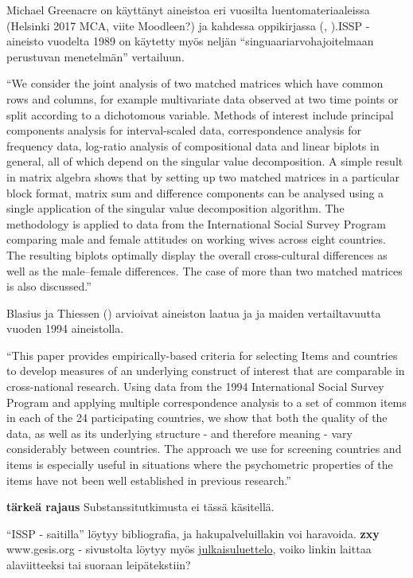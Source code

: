 \documentclass[
  finnish,
]{book}
\begin{document}
Michael Greenacre on käyttänyt aineistoa eri vuosilta luentomateriaaleissa (Helsinki 2017 MCA, viite Moodleen?) ja kahdessa oppikirjassa (\citep{RefWorks:doc:5a857a43e4b0ed2d44664d7c}, \citep{RefWorks:doc:5a857a43e4b0ed2d44664d78}).ISSP - aineisto vuodelta 1989 on käytetty myös neljän ``singuaariarvohajoitelmaan perustuvan menetelmän'' vertailuun\citep{RefWorks:doc:5b6f159ce4b0bc0f31734b76}.

``We consider the joint analysis of two matched matrices which have common
rows and columns, for example multivariate data observed at two time points or split
according to a dichotomous variable. Methods of interest include principal components
analysis for interval-scaled data, correspondence analysis for frequency data, log-ratio
analysis of compositional data and linear biplots in general, all of which depend on the
singular value decomposition. A simple result in matrix algebra shows that by setting up
two matched matrices in a particular block format, matrix sum and difference components
can be analysed using a single application of the singular value decomposition algorithm.
The methodology is applied to data from the International Social Survey Program
comparing male and female attitudes on working wives across eight countries. The resulting
biplots optimally display the overall cross-cultural differences as well as the male--female
differences. The case of more than two matched matrices is also discussed.''

Blasius ja Thiessen (\citep{RefWorks:doc:5b15542ee4b0e2616bc42dca}) arvioivat aineiston laatua ja ja maiden vertailtavuutta vuoden 1994 aineistolla.

``This paper provides empirically-based criteria for selecting Items and countries to develop measures of an underlying construct of interest that are comparable in cross-national research. Using data from the 1994 International Social Survey Program and applying multiple correspondence analysis to a set of common items in each of the 24 participating countries, we show that both the quality of the data, as well as its underlying structure - and therefore meaning - vary considerably between countries. The approach we use for screening countries and items is especially useful in situations where the psychometric properties of the items have not been well established in previous research.''

\textbf{tärkeä rajaus} Substanssitutkimusta ei tässä käsitellä.

``ISSP - saitilla'' löytyy bibliografia, ja hakupalveluillakin voi haravoida.
\textbf{zxy} www.gesis.org - sivustolta löytyy myös \href{https://search.gesis.org/research_data/ZA5900}{julkaisuluettelo}, voiko linkin laittaa alaviitteeksi tai suoraan leipätekstiin?
\end{document}
